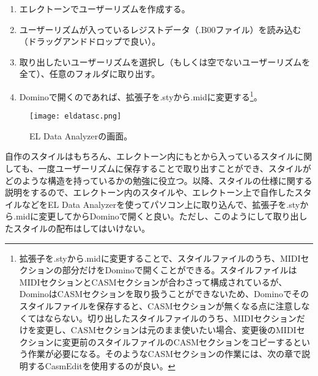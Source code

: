 \documentclass[uplatex, 10pt, dvipdfmx]{jsarticle}
\numberwithin{equation}{section}
\begin{document}
\begin{enumerate}
  \item エレクトーンでユーザーリズムを作成する。
  \item ユーザーリズムが入っているレジストデータ（.B00ファイル）を読み込む（ドラッグアンドドロップで良い）。
  \item 取り出したいユーザーリズムを選択し（もしくは空でないユーザーリズムを全て）、任意のフォルダに取り出す。
  \item Dominoで開くのであれば、拡張子を.styから.midに変更する\footnote{拡張子を.styから.midに変更することで、スタイルファイルのうち、MIDIセクションの部分だけをDominoで開くことができる。スタイルファイルはMIDIセクションとCASMセクションが合わさって構成されているが、DominoはCASMセクションを取り扱うことができないため、Dominoでそのスタイルファイルを保存すると、CASMセクションが無くなる点に注意しなくてはならない。切り出したスタイルファイルのうち、MIDIセクションだけを変更し、CASMセクションは元のまま使いたい場合、変更後のMIDIセクションに変更前のスタイルファイルのCASMセクションをコピーするという作業が必要になる。そのようなCASMセクションの作業には、次の章で説明するCasmEditを使用するのが良い。}。
\end{enumerate}
\begin{wrapfigure}{r}[5mm]{70mm}
  \centering
  \texttt{[image: eldatasc.png]}
  \caption{EL Data Analyzerの画面。}
  \label{figeldatasc}
\end{wrapfigure}

自作のスタイルはもちろん、エレクトーン内にもとから入っているスタイルに関しても、一度ユーザーリズムに保存することで取り出すことができ、スタイルがどのような構造を持っているかの勉強に役立つ。以降、スタイルの仕様に関する説明をするので、エレクトーン内のスタイルや、エレクトーン上で自作したスタイルなどをEL Data Analyzerを使ってパソコン上に取り込んで、拡張子を.styから.midに変更してからDominoで開くと良い。ただし、このようにして取り出したスタイルの配布はしてはいけない。
\end{document}
